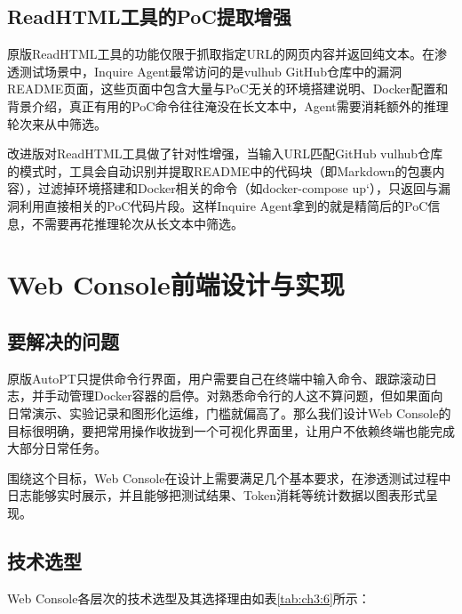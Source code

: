 \subsection{ReadHTML工具的PoC提取增强}

原版ReadHTML工具的功能仅限于抓取指定URL的网页内容并返回纯文本。在渗透测试场景中，Inquire Agent最常访问的是vulhub GitHub仓库中的漏洞README页面，这些页面中包含大量与PoC无关的环境搭建说明、Docker配置和背景介绍，真正有用的PoC命令往往淹没在长文本中，Agent需要消耗额外的推理轮次来从中筛选。

改进版对ReadHTML工具做了针对性增强，当输入URL匹配GitHub vulhub仓库的模式时，工具会自动识别并提取README中的代码块（即Markdown的\texttt{}包裹内容），过滤掉环境搭建和Docker相关的命令（如docker-compose up`），只返回与漏洞利用直接相关的PoC代码片段。这样Inquire Agent拿到的就是精简后的PoC信息，不需要再花推理轮次从长文本中筛选。

\section{Web Console前端设计与实现}

\subsection{要解决的问题}

原版AutoPT只提供命令行界面，用户需要自己在终端中输入命令、跟踪滚动日志，并手动管理Docker容器的启停。对熟悉命令行的人这不算问题，但如果面向日常演示、实验记录和图形化运维，门槛就偏高了。那么我们设计Web Console的目标很明确，要把常用操作收拢到一个可视化界面里，让用户不依赖终端也能完成大部分日常任务。

围绕这个目标，Web Console在设计上需要满足几个基本要求，在渗透测试过程中日志能够实时展示，并且能够把测试结果、Token消耗等统计数据以图表形式呈现。

\subsection{技术选型}

Web Console各层次的技术选型及其选择理由如表\ref{tab:ch3:6}所示：

